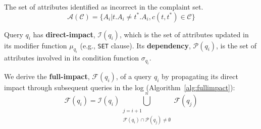 
\begin{definition} 
	The set of attributes identified as incorrect in the complaint set.
	\[\mathcal{A}(\mathcal{C}) = \{A_i | t.A_i \neq t^*.A_i, c(t,t^*) \in \mathcal{C}\}\]
\end{definition} 


\begin{definition}
    Query $q_i$ has \textbf{direct-impact}, $\mathcal{I}(q_i)$, which is
    the set of attributes updated in its modifier function $\mu_{q_i}$
    (e.g., \texttt{SET} clause). Its \textbf{dependency},
    $\mathcal{P}(q_i)$, is the set of attributes involved in its
    condition function $\sigma_{q_i}$.
    
    We derive the \textbf{full-impact}, $\mathcal{F}(q_i)$, of a query $q_i$ by propagating its direct impact through subsequent queries in the log (Algorithm~\ref{alg:fullimpact}):
    \[
    \mathcal{F}(q_i)=\mathcal{I}(q_i)\bigcup_{\substack{j=i+1\\ \mathcal{F}(q_i)\cap \mathcal{P}(q_j) \neq \emptyset}}^n \mathcal{F}(q_j)
    \]
\end{definition}

